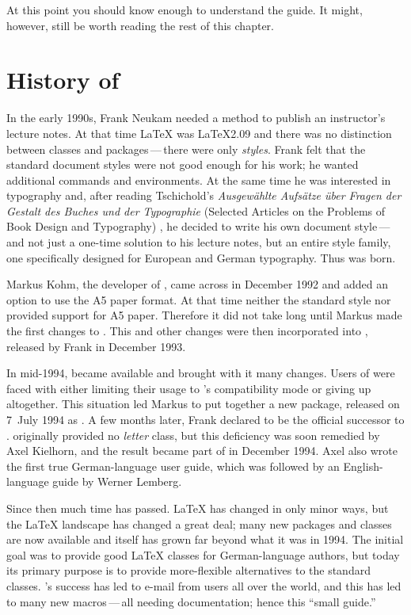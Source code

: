 At this point you should know enough to understand the guide.
It might, however, still be worth reading the rest of this chapter.

\section{History of {\KOMAScript}}

In the early 1990s, Frank Neukam needed a method to publish an instructor's
lecture notes. At that time {\LaTeX} was {\LaTeX}2.09 and there was no
distinction between classes and packages\,---\,there were only \emph{styles}.
Frank felt that the standard document styles were not good enough for his
work; he wanted additional commands and environments. At the same time he was
interested in typography and, after reading Tschichold's \emph{Ausgew\"ahlte
  Aufs\"atze \"uber Fragen der Gestalt des Buches und der Typographie}
(Selected Articles on the Problems of Book Design and Typography)
\cite{JTsch87}, he decided to write his own document style\,---\,and not just
a one-time solution to his lecture notes, but an entire style family, one
specifically designed for European and German typography. Thus {\Script} was
born.

Markus Kohm, the developer of {\KOMAScript}, came across {\Script} in December
1992 and added an option to use the A5 paper format. At that time neither the
standard style nor {\Script} provided support for A5 paper. Therefore it did
not take long until Markus made the first changes to {\Script}. This and other
changes were then incorporated into {\ScriptII}, released by Frank in December
1993.

In mid-1994, {\LaTeXe} became available and brought with it many changes.
Users of {\ScriptII} were faced with either limiting their usage to
{\LaTeXe}'s compatibility mode or giving up {\Script} altogether.  This
situation led Markus to put together a new {\LaTeXe} package, released on
7~July 1994 as {\KOMAScript}. A few months later, Frank declared {\KOMAScript}
to be the official successor to {\Script}. {\KOMAScript} originally provided
no \emph{letter} class, but this deficiency was soon remedied by Axel
Kielhorn, and the result became part of {\KOMAScript} in December 1994.  Axel
also wrote the first true German-language user guide, which was followed by an
English-language guide by Werner Lemberg.

Since then much time has passed. {\LaTeX} has changed in only minor ways, but
the {\LaTeX} landscape has changed a great deal; many new packages and classes
are now available and {\KOMAScript} itself has grown far beyond what it was in
1994. The initial goal was to provide good {\LaTeX} classes for
German-language authors, but today its primary purpose is to provide
more-flexible alternatives to the standard classes. {\KOMAScript}'s success
has led to e-mail from users all over the world, and this has led to many new
macros\,---\,all needing documentation; hence this ``small guide.''


